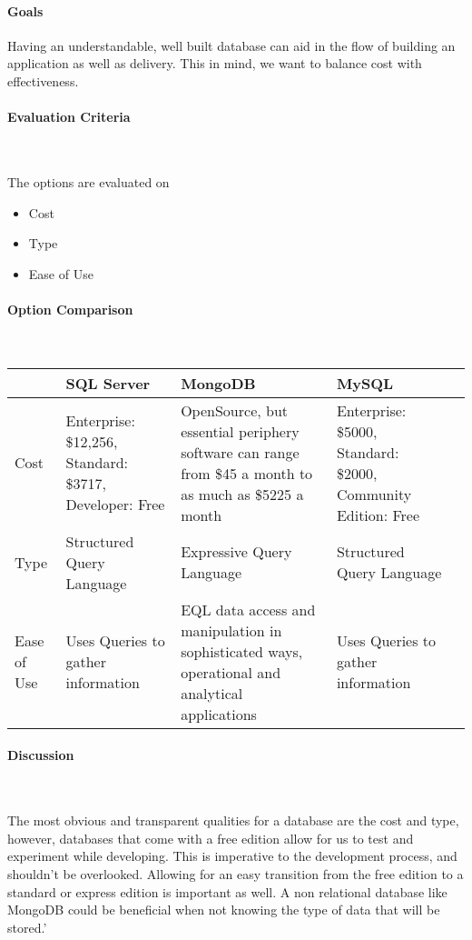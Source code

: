 \documentclass[letterpaper, 10pt, draftclsnofoot, compsoc, onecolumn]{IEEEtran}
\begin{document}
{\paragraph{Goals}
{\noindent Having an understandable, well built database can aid in the flow of building an application as well as delivery. This in mind, we want to balance cost with effectiveness. \par}

\medskip
\newpage
\paragraph{Evaluation Criteria} ~\\
{\noindent The options are evaluated on 

\begin{itemize}
\item Cost
\item Type
\item Ease of Use
\end{itemize}

 \par}


\newpage
\paragraph{Option Comparison} ~\\
\tablehead{}
\begin{supertabular}{|p{2cm}|p{2.5cm}|p{2.5cm}|p{2.5cm}|p{2.5cm}|}
\hline & SQL Server & MongoDB & MySQL\\ \hline
Cost & Enterprise: \$12,256, Standard: \$3717, Developer: Free & OpenSource, but essential periphery software can range from \$45 a month to as much as \$5225 a month & Enterprise: \$5000, Standard: \$2000, Community Edition: Free \\ \hline
Type & Structured Query Language & Expressive Query Language & Structured Query Language\\ \hline
Ease of Use & Uses Queries to gather information & EQL data access and manipulation in sophisticated ways, operational and analytical applications \cite{ibmbpnetwork} & Uses Queries to gather information \\ \hline
\end{supertabular}

\newpage
\paragraph{Discussion} ~\\
{\noindent The most obvious and transparent qualities for a database are the cost and type, however, databases that come with a free edition allow for us to test and experiment while developing. This is imperative to the development process, and shouldn't be overlooked. Allowing for an easy transition from the free edition to a standard or express edition is important as well. A non relational database like MongoDB could be beneficial when not knowing the type of data that will be stored.' \par}

}
\end{document}
